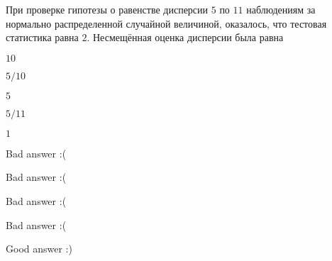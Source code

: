 
\begin{question}
При проверке гипотезы о равенстве дисперсии \(5\) по \(11\) наблюдениям
за нормально распределенной случайной величиной, оказалось, что тестовая
статистика равна \(2\). Несмещённая оценка дисперсии была равна
\begin{answerlist}
  \item \(10\)
  \item \(5/10\)
  \item \(5\)
  \item \(5/11\)
  \item \(1\)
\end{answerlist}
\end{question}

\begin{solution}
\begin{answerlist}
  \item Bad answer :(
  \item Bad answer :(
  \item Bad answer :(
  \item Bad answer :(
  \item Good answer :)
\end{answerlist}
\end{solution}

